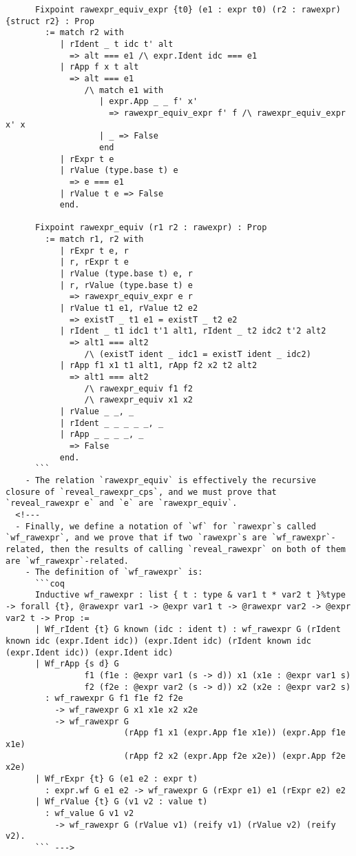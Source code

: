 \begin{verbatim}
      Fixpoint rawexpr_equiv_expr {t0} (e1 : expr t0) (r2 : rawexpr) {struct r2} : Prop
        := match r2 with
           | rIdent _ t idc t' alt
             => alt === e1 /\ expr.Ident idc === e1
           | rApp f x t alt
             => alt === e1
                /\ match e1 with
                   | expr.App _ _ f' x'
                     => rawexpr_equiv_expr f' f /\ rawexpr_equiv_expr x' x
                   | _ => False
                   end
           | rExpr t e
           | rValue (type.base t) e
             => e === e1
           | rValue t e => False
           end.

      Fixpoint rawexpr_equiv (r1 r2 : rawexpr) : Prop
        := match r1, r2 with
           | rExpr t e, r
           | r, rExpr t e
           | rValue (type.base t) e, r
           | r, rValue (type.base t) e
             => rawexpr_equiv_expr e r
           | rValue t1 e1, rValue t2 e2
             => existT _ t1 e1 = existT _ t2 e2
           | rIdent _ t1 idc1 t'1 alt1, rIdent _ t2 idc2 t'2 alt2
             => alt1 === alt2
                /\ (existT ident _ idc1 = existT ident _ idc2)
           | rApp f1 x1 t1 alt1, rApp f2 x2 t2 alt2
             => alt1 === alt2
                /\ rawexpr_equiv f1 f2
                /\ rawexpr_equiv x1 x2
           | rValue _ _, _
           | rIdent _ _ _ _ _, _
           | rApp _ _ _ _, _
             => False
           end.
      ```
    - The relation `rawexpr_equiv` is effectively the recursive closure of `reveal_rawexpr_cps`, and we must prove that `reveal_rawexpr e` and `e` are `rawexpr_equiv`.
  <!---
  - Finally, we define a notation of `wf` for `rawexpr`s called `wf_rawexpr`, and we prove that if two `rawexpr`s are `wf_rawexpr`-related, then the results of calling `reveal_rawexpr` on both of them are `wf_rawexpr`-related.
    - The definition of `wf_rawexpr` is:
      ```coq
      Inductive wf_rawexpr : list { t : type & var1 t * var2 t }%type -> forall {t}, @rawexpr var1 -> @expr var1 t -> @rawexpr var2 -> @expr var2 t -> Prop :=
      | Wf_rIdent {t} G known (idc : ident t) : wf_rawexpr G (rIdent known idc (expr.Ident idc)) (expr.Ident idc) (rIdent known idc (expr.Ident idc)) (expr.Ident idc)
      | Wf_rApp {s d} G
                f1 (f1e : @expr var1 (s -> d)) x1 (x1e : @expr var1 s)
                f2 (f2e : @expr var2 (s -> d)) x2 (x2e : @expr var2 s)
        : wf_rawexpr G f1 f1e f2 f2e
          -> wf_rawexpr G x1 x1e x2 x2e
          -> wf_rawexpr G
                        (rApp f1 x1 (expr.App f1e x1e)) (expr.App f1e x1e)
                        (rApp f2 x2 (expr.App f2e x2e)) (expr.App f2e x2e)
      | Wf_rExpr {t} G (e1 e2 : expr t)
        : expr.wf G e1 e2 -> wf_rawexpr G (rExpr e1) e1 (rExpr e2) e2
      | Wf_rValue {t} G (v1 v2 : value t)
        : wf_value G v1 v2
          -> wf_rawexpr G (rValue v1) (reify v1) (rValue v2) (reify v2).
      ``` --->
\end{verbatim}

